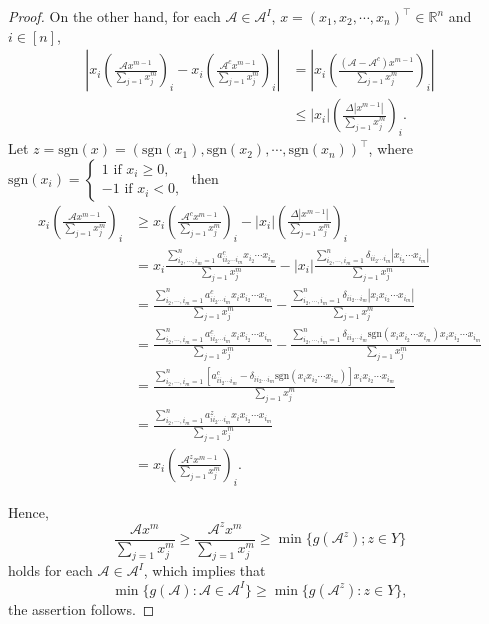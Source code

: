 \documentclass[twoside]{article}
\begin{document}
\begin{proof}
On the other hand, for each $\mathcal{A}\in \mathcal{A}^I$, $x=(x_1,x_2,\cdots,x_n)^{\top}\in\mathbb{R}^n$ and $i\in[n]$,
\begin{align*}
|x_i(\frac{\mathcal{A}x^{m-1}}{\sum\limits_{j=1}x_j^m})_i-x_i(\frac{\mathcal{A}^cx^{m-1}}{\sum\limits_{j=1}x_j^m})_i| &=|x_i(\frac{(\mathcal{A}-\mathcal{A}^c)x^{m-1}}{\sum\limits_{j=1}x_j^m})_i|\\
&\leq|x_i|(\frac{\Delta |x^{m-1}|}{\sum\limits_{j=1}x_j^m})_i.
\end{align*}
Let $z=\mbox{sgn}(x)=(\mbox{sgn}(x_1),\mbox{sgn}(x_2),\cdots,\mbox{sgn}(x_n))^{\top}$, where
$\mbox{sgn}(x_i)=\left
\{\begin{array}{ll}
1\mbox{ if }x_i\geq0,\\
-1\mbox{ if }x_i<0,
\end{array}
\right.$ then
\begin{align*}
x_i(\frac{\mathcal{A}x^{m-1}}{\sum\limits_{j=1}x_j^m})_i &\geq x_i(\frac{\mathcal{A}^cx^{m-1}}{\sum\limits_{j=1}x_j^m})_i-|x_i|(\frac{\Delta |x^{m-1}|}{\sum\limits_{j=1}x_j^m})_i\\
&=x_i\frac{\sum\limits_{i_2,\cdots,i_m=1}^na^c_{ii_2\cdots i_m}x_{i_2}\cdots x_{i_m}}{\sum\limits_{j=1}x_j^m}-|x_i|\frac{\sum\limits_{i_2,\cdots,i_m=1}^n\delta_{ii_2\cdots i_m}|x_{i_2}\cdots x_{i_m}|}{\sum\limits_{j=1}x_j^m}\\
&=\frac{\sum\limits_{i_2,\cdots,i_m=1}^na^c_{ii_2\cdots i_m}x_ix_{i_2}\cdots x_{i_m}}{\sum\limits_{j=1}x_j^m}-\frac{\sum\limits_{i_2,\cdots,i_m=1}^n\delta_{ii_2\cdots i_m}|x_ix_{i_2}\cdots x_{i_m}|}{\sum\limits_{j=1}x_j^m}\\
&=\frac{\sum\limits_{i_2,\cdots,i_m=1}^na^c_{ii_2\cdots i_m}x_ix_{i_2}\cdots x_{i_m}}{\sum\limits_{j=1}x_j^m}-\frac{\sum\limits_{i_2,\cdots,i_m=1}^n\delta_{ii_2\cdots i_m}\mbox{sgn}(x_ix_{i_2}\cdots x_{i_m})x_ix_{i_2}\cdots x_{i_m}}{\sum\limits_{j=1}x_j^m}\\
&=\frac{\sum\limits_{i_2,\cdots,i_m=1}^n[a^c_{ii_2\cdots i_m}-\delta_{ii_2\cdots i_m}\mbox{sgn}(x_ix_{i_2}\cdots x_{i_m})]x_ix_{i_2}\cdots x_{i_m}}{\sum\limits_{j=1}x_j^m}\\
&=\frac{\sum\limits_{i_2,\cdots,i_m=1}^na^z_{ii_2\cdots i_m}x_ix_{i_2}\cdots x_{i_m}}{\sum\limits_{j=1}x_j^m}\\
&=x_i(\frac{\mathcal{A}^z x^{m-1}}{\sum\limits_{j=1}x_j^m})_i.
\end{align*}


Hence,
$$\frac{\mathcal{A}x^m}{\sum\limits_{j=1}x_j^m}\geq\frac{\mathcal{A}^zx^m}{\sum\limits_{j=1}x_j^m}\geq\min\{g(\mathcal{A}^z);z\in Y\}$$
holds for each $\mathcal{A} \in \mathcal{A}^I$, which implies that
$$\min\{g(\mathcal{A}):\mathcal{A}\in\mathcal{A}^I\}\geq \min\{g(\mathcal{A}^z):z\in Y\},$$
the assertion follows.


\end{proof}
\end{document}
